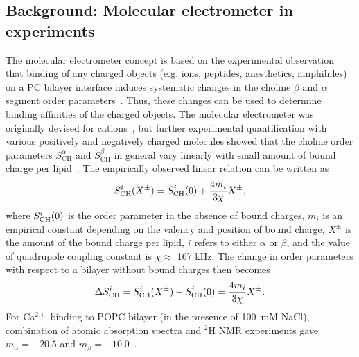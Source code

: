 \documentclass[twoside,twocolumn,9pt]{article}
\begin{document}
\subsection{Background: Molecular electrometer in experiments}\label{conceptinexperiments}
The molecular electrometer concept is based on the experimental observation that
binding of any charged objects (e.g. ions, peptides, anesthetics, amphihiles) on a PC bilayer interface induces 
systematic changes in the choline $\beta$ and $\alpha$
segment order parameters~\cite{akutsu81,altenbach84,altenbach85,seelig87,macdonald87,scherer89,roux90,beschiasvili91,marassi92,rydall92}.
Thus, these changes can be used to determine binding affinities of the charged objects.
The molecular electrometer was originally devised for cations~\cite{akutsu81,altenbach84}, but
further experimental quantification with various positively and negatively charged 
molecules showed that the choline order parameters $S_\mathrm{CH}^\alpha$ and $S_\mathrm{CH}^\beta$ 
in general vary linearly with small amount of bound charge per 
lipid~\cite{altenbach84,altenbach85,seelig87,macdonald87,scherer89,roux90,beschiasvili91,marassi92,rydall92}. 
The empirically observed linear relation can be written as~\cite{ferreira16}
\begin{equation}\label{electrometer_eq}
S_{\rm{CH}}^{i}(X^\pm)=S_{\rm{CH}}^{i}(0) + \frac{4m_i}{3\chi} X^\pm,
\end{equation}
where $S_{\rm{CH}}^{i}(0)$ is the order parameter in the absence of bound charges,
$m_i$ is an empirical constant depending on the valency and position of bound charge,
$X^\pm$ is the amount of the bound charge per lipid, 
$i$ refers to either $\alpha$ or $\beta$, and
the value of quadrupole coupling constant is $\chi \approx$ 167 kHz. 
The change in order parameters with respect to a bilayer without bound charges then becomes
\begin{equation}\label{OPchangeEQ}
\Delta S_{\rm{CH}}^{i}= S_{\rm{CH}}^{i}(X^\pm)-S_{\rm{CH}}^{i}(0) =\frac{4m_i }{3\chi}X^\pm.
\end{equation}
For Ca$^{2+}$ binding to POPC bilayer (in the presence of 100~mM NaCl),
combination of atomic absorption spectra and $^2$H NMR experiments gave
$m_\alpha=-20.5$  and $m_\beta=-10.0$~\cite{altenbach84}.
\end{document}
